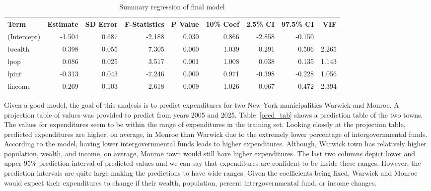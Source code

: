 \documentclass[11pt]{article}\usepackage[]{graphicx}\usepackage[]{color}
\begin{document}
\begin{center}
\begin{table}[ht]
\centering
\begin{tabular}{lrrrrrrrr}
  \hline
Term & Estimate & SD Error & F-Statistics & P Value & 10\% Coef & 2.5\% CI & 97.5\% CI & VIF \\ 
  \hline
(Intercept) & -1.504 & 0.687 & -2.188 & 0.030 & 0.866 & -2.858 & -0.150 &  \\ 
  lwealth & 0.398 & 0.055 & 7.305 & 0.000 & 1.039 & 0.291 & 0.506 & 2.265 \\ 
  lpop & 0.086 & 0.025 & 3.517 & 0.001 & 1.008 & 0.038 & 0.135 & 1.143 \\ 
  lpint & -0.313 & 0.043 & -7.246 & 0.000 & 0.971 & -0.398 & -0.228 & 1.056 \\ 
  lincome & 0.269 & 0.103 & 2.618 & 0.009 & 1.026 & 0.067 & 0.472 & 2.394 \\ 
   \hline
\end{tabular}
\caption{Summary regression of final model} 
\label{reg_summary_final}
\end{table}

\end{center}

\noindent Given a good model, the goal of this analysis is to predict expenditures for two New York municipalities Warwick and Monroe. A projection table of values was provided to predict from years 2005 and 2025. Table~\ref{pred_tab} shows a prediction table of the two towns. The values for expenditures seem to be within the range of expenditures in the training set. Looking closely at the projection table, predicted expenditures are higher, on average, in Monroe than Warwick due to the extremely lower percentage of intergovernmental funds. According to the model, having lower intergovernmental funds leads to higher expenditures. Although, Warwick town has relatively higher population, wealth, and income, on average, Monroe town would still have higher expenditures. The last two columns depict lower and upper 95\% prediction interval of predicted values and we can say that expenditures are confident to be inside these ranges. However, the prediction intervals are quite large making the predictions to have wide ranges. Given the coefficients being fixed, Warwick and Monroe would expect their expenditures to change if their wealth, population, percent intergovernmental fund, or income changes.    
\end{document}
